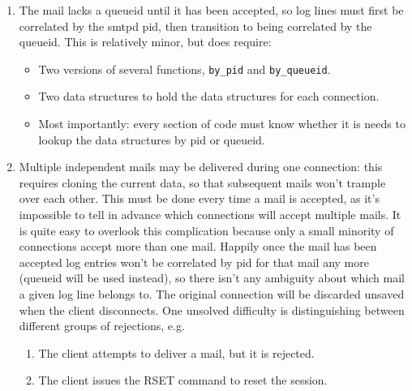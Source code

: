 \documentclass[a4paper,12pt,draft]{article}
\begin{document}
\begin{enumerate}

    \item The mail lacks a queueid until it has been accepted, so log lines
        must first be correlated by the smtpd pid, then transition to being
        correlated by the queueid.  This is relatively minor, but does
        require:

        \begin{itemize}

            \item Two versions of several functions, \texttt{by\_pid} and
                \texttt{by\_queueid}.

            \item Two data structures to hold the data structures for each
                connection.

            \item Most importantly: every section of code must know whether
                it is needs to lookup the data structures by pid or
                queueid.

        \end{itemize}

    \item Multiple independent mails may be delivered during one
        connection: this requires cloning the current data, so that
        subsequent mails won't trample over each other.  This must be done
        every time a mail is accepted, as it's impossible to tell in
        advance which connections will accept multiple mails.  It is quite
        easy to overlook this complication because only a small minority of
        connections accept more than one mail. Happily once the mail has
        been accepted log entries won't be correlated by pid for that mail
        any more (queueid will be used instead), so there isn't any
        ambiguity about which mail a given log line belongs to.  The
        original connection will be discarded unsaved when the client
        disconnects.  One unsolved difficulty is distinguishing between
        different groups of rejections, e.g.

        \begin{enumerate}

            \item The client attempts to deliver a mail, but it is
                rejected.

            \item The client issues the RSET command to reset the session.


\end{enumerate}
\end{enumerate}
\end{document}
